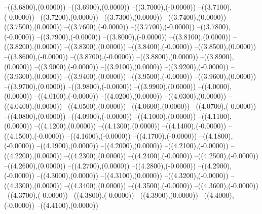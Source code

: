 {	--({\sx*(3.6800)},{\sy*(0.0000)})
	--({\sx*(3.6900)},{\sy*(0.0000)})
	--({\sx*(3.7000)},{\sy*(-0.0000)})
	--({\sx*(3.7100)},{\sy*(-0.0000)})
	--({\sx*(3.7200)},{\sy*(0.0000)})
	--({\sx*(3.7300)},{\sy*(0.0000)})
	--({\sx*(3.7400)},{\sy*(0.0000)})
	--({\sx*(3.7500)},{\sy*(0.0000)})
	--({\sx*(3.7600)},{\sy*(-0.0000)})
	--({\sx*(3.7700)},{\sy*(-0.0000)})
	--({\sx*(3.7800)},{\sy*(-0.0000)})
	--({\sx*(3.7900)},{\sy*(-0.0000)})
	--({\sx*(3.8000)},{\sy*(-0.0000)})
	--({\sx*(3.8100)},{\sy*(0.0000)})
	--({\sx*(3.8200)},{\sy*(0.0000)})
	--({\sx*(3.8300)},{\sy*(0.0000)})
	--({\sx*(3.8400)},{\sy*(-0.0000)})
	--({\sx*(3.8500)},{\sy*(0.0000)})
	--({\sx*(3.8600)},{\sy*(-0.0000)})
	--({\sx*(3.8700)},{\sy*(-0.0000)})
	--({\sx*(3.8800)},{\sy*(0.0000)})
	--({\sx*(3.8900)},{\sy*(0.0000)})
	--({\sx*(3.9000)},{\sy*(-0.0000)})
	--({\sx*(3.9100)},{\sy*(0.0000)})
	--({\sx*(3.9200)},{\sy*(-0.0000)})
	--({\sx*(3.9300)},{\sy*(0.0000)})
	--({\sx*(3.9400)},{\sy*(0.0000)})
	--({\sx*(3.9500)},{\sy*(-0.0000)})
	--({\sx*(3.9600)},{\sy*(0.0000)})
	--({\sx*(3.9700)},{\sy*(0.0000)})
	--({\sx*(3.9800)},{\sy*(-0.0000)})
	--({\sx*(3.9900)},{\sy*(0.0000)})
	--({\sx*(4.0000)},{\sy*(0.0000)})
	--({\sx*(4.0100)},{\sy*(-0.0000)})
	--({\sx*(4.0200)},{\sy*(0.0000)})
	--({\sx*(4.0300)},{\sy*(0.0000)})
	--({\sx*(4.0400)},{\sy*(0.0000)})
	--({\sx*(4.0500)},{\sy*(0.0000)})
	--({\sx*(4.0600)},{\sy*(0.0000)})
	--({\sx*(4.0700)},{\sy*(-0.0000)})
	--({\sx*(4.0800)},{\sy*(0.0000)})
	--({\sx*(4.0900)},{\sy*(-0.0000)})
	--({\sx*(4.1000)},{\sy*(0.0000)})
	--({\sx*(4.1100)},{\sy*(0.0000)})
	--({\sx*(4.1200)},{\sy*(0.0000)})
	--({\sx*(4.1300)},{\sy*(0.0000)})
	--({\sx*(4.1400)},{\sy*(-0.0000)})
	--({\sx*(4.1500)},{\sy*(-0.0000)})
	--({\sx*(4.1600)},{\sy*(-0.0000)})
	--({\sx*(4.1700)},{\sy*(-0.0000)})
	--({\sx*(4.1800)},{\sy*(-0.0000)})
	--({\sx*(4.1900)},{\sy*(0.0000)})
	--({\sx*(4.2000)},{\sy*(0.0000)})
	--({\sx*(4.2100)},{\sy*(-0.0000)})
	--({\sx*(4.2200)},{\sy*(0.0000)})
	--({\sx*(4.2300)},{\sy*(0.0000)})
	--({\sx*(4.2400)},{\sy*(-0.0000)})
	--({\sx*(4.2500)},{\sy*(-0.0000)})
	--({\sx*(4.2600)},{\sy*(0.0000)})
	--({\sx*(4.2700)},{\sy*(0.0000)})
	--({\sx*(4.2800)},{\sy*(-0.0000)})
	--({\sx*(4.2900)},{\sy*(-0.0000)})
	--({\sx*(4.3000)},{\sy*(0.0000)})
	--({\sx*(4.3100)},{\sy*(0.0000)})
	--({\sx*(4.3200)},{\sy*(-0.0000)})
	--({\sx*(4.3300)},{\sy*(0.0000)})
	--({\sx*(4.3400)},{\sy*(0.0000)})
	--({\sx*(4.3500)},{\sy*(-0.0000)})
	--({\sx*(4.3600)},{\sy*(-0.0000)})
	--({\sx*(4.3700)},{\sy*(-0.0000)})
	--({\sx*(4.3800)},{\sy*(-0.0000)})
	--({\sx*(4.3900)},{\sy*(0.0000)})
	--({\sx*(4.4000)},{\sy*(-0.0000)})
	--({\sx*(4.4100)},{\sy*(0.0000)})
}
